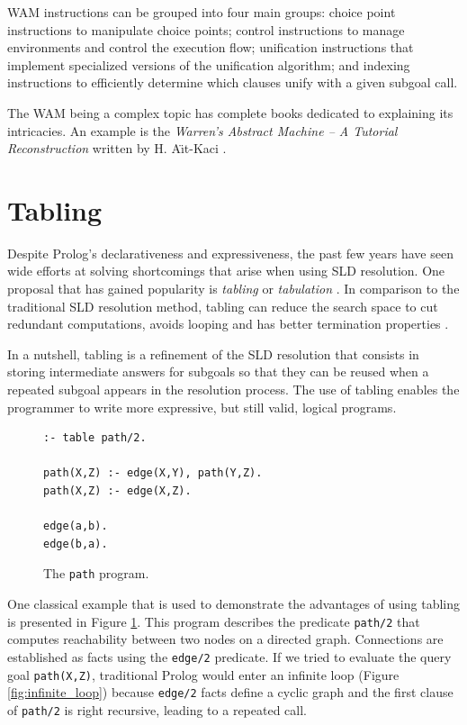 WAM instructions can be grouped into four main groups: choice point instructions to manipulate choice points; control
instructions to manage environments and control the execution flow; unification instructions that implement
specialized versions of the unification algorithm; and indexing instructions to efficiently determine which clauses
unify with a given subgoal call.

The WAM being a complex topic has complete books dedicated to explaining its intricacies.
An example is the \textit{Warren's Abstract Machine -- A Tutorial Reconstruction} written by H. A\"{\i}t-Kaci \cite{Aitkaci-91}. 

\section{Tabling}

Despite Prolog's declarativeness and expressiveness, the past few years have seen wide efforts at
solving shortcomings that arise when using SLD resolution.
One proposal that has gained popularity is \textit{tabling} or \textit{tabulation} \cite{Chen-96}.
In comparison to the traditional SLD resolution method, tabling can reduce the search space to cut redundant computations,
avoids looping and has better termination properties \cite{Tamaki-86}.

In a nutshell, tabling is a refinement of the SLD resolution that consists in storing intermediate answers for
subgoals so that they can be reused when a repeated subgoal appears in the resolution process.
The use of tabling enables the programmer to write more expressive, but still valid, logical programs.

\begin{figure}[ht]
\begin{verbatim}
:- table path/2.

path(X,Z) :- edge(X,Y), path(Y,Z).
path(X,Z) :- edge(X,Z).

edge(a,b).
edge(b,a).
\end{verbatim}
\caption{The \texttt{path} program.}
\label{fig:prolog_path}
\end{figure}

One classical example that is used to demonstrate the advantages of using tabling is presented in Figure \ref{fig:prolog_path}.
This program describes the predicate \texttt{path/2} that computes reachability between two nodes on a directed graph.
Connections are established as facts using the \texttt{edge/2} predicate.
If we tried to evaluate the query goal \texttt{path(X,Z)}, traditional Prolog would enter an infinite
loop (Figure \ref{fig:infinite_loop}) because \texttt{edge/2} facts define a cyclic graph and the first
clause of \texttt{path/2} is right recursive, leading to a repeated call.

